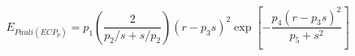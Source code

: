 


$$
E_{Pauli(ECP_p)}=p_1\left( \frac{2}{p_2/s+s/p_2} \right)\left( r-p_3s\right)^2\exp \left[ -\frac{p_4\left( r-p_3s \right)^2}{p_5+s^2} \right] 
$$

  